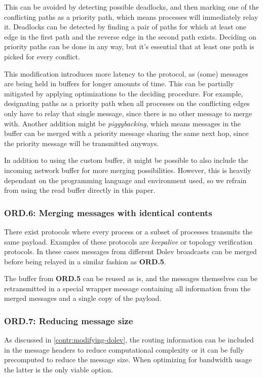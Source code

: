 This can be avoided by detecting possible deadlocks, and then marking one of the conflicting paths as a priority path, which means processes will immediately relay it. Deadlocks can be detected by finding a pair of paths for which at least one edge in the first path and the reverse edge in the second path exists. Deciding on priority paths can be done in any way, but it's essential that at least one path is picked for every conflict.

This modification introduces more latency to the protocol, as (some) messages are being held in buffers for longer amounts of time. This can be partially mitigated by applying optimizations to the deciding procedure. For example, designating paths as a priority path when all processes on the conflicting edges only have to relay that single message, since there is no other message to merge with. Another addition might be \textit{piggybacking}, which means messages in the buffer can be merged with a priority message sharing the same next hop, since the priority message will be transmitted anyways.

In addition to using the custom buffer, it might be possible to also include the incoming network buffer for more merging possibilities. However, this is heavily dependant on the programming language and environment used, so we refrain from using the read buffer directly in this paper.

\subsubsection{ORD.6: Merging messages with identical contents}
There exist protocols where every process or a subset of processes transmits the same payload. Examples of these protocols are \textit{keepalive} or topology verification protocols. In these cases messages from different Dolev broadcasts can be merged before being relayed in a similar fashion as \textbf{ORD.5}.

The buffer from \textbf{ORD.5} can be reused as is, and the messages themselves can be retransmitted in a special wrapper message containing all information from the merged messages and a single copy of the payload.

\subsubsection{ORD.7: Reducing message size}
As discussed in \ref{contr:modifying-dolev}, the routing information can be included in the message headers to reduce computational complexity or it can be fully precomputed to reduce the message size. When optimizing for bandwidth usage the latter is the only viable option. 

